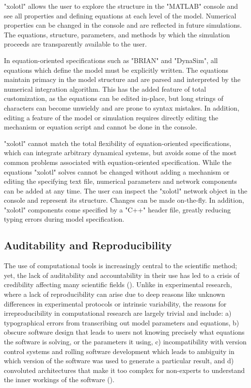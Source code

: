 \documentclass{frontiersSCNS} %
\begin{document}
"xolotl" allows the user to explore the structure in the "MATLAB" console and see all properties and defining equations at each level of the model. Numerical properties can be changed in the console and are reflected in future simulations. The equations, structure, parameters, and methods by which the simulation proceeds are transparently available to the user.

In equation-oriented specifications such as "BRIAN" and "DynaSim", all equations which define the model must be explicitly written. The equations maintain primacy in the model structure and are parsed and interpreted by the numerical integration algorithm. This has the added feature of total customization, as the equations can be edited in-place, but long strings of characters can become unwieldy and are prone to syntax mistakes. In addition, editing a feature of the model or simulation requires directly editing the mechanism or equation script and cannot be done in the console.

"xolotl" cannot match the total flexibility of equation-oriented specifications, which can integrate arbitrary dynamical systems, but avoids some of the most common problems associated with equation-oriented specification. While the equations "xolotl" solves cannot be changed without adding a mechanism or editing the specifying text file, numerical parameters and network components can be added at any time. The user can inspect the "xolotl" network object in the console and represent its structure. Changes can be made on-the-fly. In addition, "xolotl" components come specified by a "C++" header file, greatly reducing typing errors during model specification.

\subsection{Auditability and Reproducibility}

The use of computational tools is increasingly central to the scientific method; yet, the lack of auditability and accountability in their use has led to a crisis of credibility affecting many scientific fields (\cite{stoddenEnhancingReproducibilityComputational2016, bakerWhyScientistsMust2016}). Unlike in experimental research, where a lack of reproducibility can arise due to deep reasons like unknown differences in experimental protocols or intrinsic variability, the reasons for irreproducibility in computational research are largely trivial and include: a) typographical errors from transcribing out model parameters and equations, b) obscure software design that leads to users not knowing precisely what equations the software is solving, or the parameters it using, c) incompatibility with version control systems and rolling software development which leads to ambiguity in which version of the software was used to generate a particular result, and d) convoluted architectures that make it too complex for non-experts to understand the inner workings of the software (\cite{xuMeasurementSourceCode2017, sedanoCodeReadabilityTesting2016, vikstromStudyAutomaticTranslation2009}).
\end{document}
